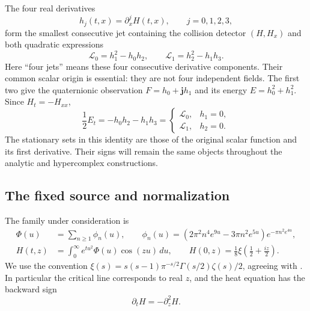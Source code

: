 \documentclass[11pt]{article}
\numberwithin{equation}{section}
\theoremstyle{definition}
\theoremstyle{remark}
\newcommand{\jj}{\mathbf j}
\newcommand{\dd}{\,d}
\newcommand{\Lag}{\mathcal L}
\begin{document}
The four real derivatives
\begin{equation}
 h_j(t,x)=\partial_x^jH(t,x),\qquad j=0,1,2,3,
 \label{eq:four-jets}
\end{equation}
form the smallest consecutive jet containing the collision detector
$(H,H_x)$ and both quadratic expressions
\begin{equation}
 \Lag_0=h_1^2-h_0h_2,\qquad
 \Lag_1=h_2^2-h_1h_3.
 \label{eq:laguerre-definitions}
\end{equation}
Here ``four jets'' means these four consecutive derivative components.
Their common scalar origin is essential: they are not four independent
fields. The first two give the quaternionic observation
$F=h_0+\jj h_1$ and its energy $E=h_0^2+h_1^2$. Since $H_t=-H_{xx}$,
\begin{equation}
 \frac12E_t=-h_0h_2-h_1h_3
 =\begin{cases}\Lag_0,&h_1=0,\\ \Lag_1,&h_2=0.\end{cases}
 \label{eq:stationary-energy-intro}
\end{equation}
The stationary sets in this identity are those of the original scalar
function and its first derivative. Their signs will remain the same
objects throughout the analytic and hypercomplex constructions.

\subsection{The fixed source and normalization}
The family under consideration is
\begin{align}
 \Phi(u)&=\sum_{n\ge1}\phi_n(u),\qquad
 \phi_n(u)=(2\pi^2n^4e^{9u}-3\pi n^2e^{5u})e^{-\pi n^2e^{4u}},
 \label{eq:theta-source}\\
 H(t,z)&=\int_0^\infty e^{tu^2}\Phi(u)\cos(zu)\dd u,
 \qquad H(0,z)=\frac18\xi\left(\frac12+\frac{iz}{2}\right).
 \label{eq:theta-family}
\end{align}
We use the convention
$\xi(s)=s(s-1)\pi^{-s/2}\Gamma(s/2)\zeta(s)/2$, agreeing with
\cite{polymath}. In particular the critical line corresponds to real
$z$, and the heat equation has the backward sign
\begin{equation}
 \partial_tH=-\partial_z^2H.
 \label{eq:backward-heat}
\end{equation}
\end{document}
